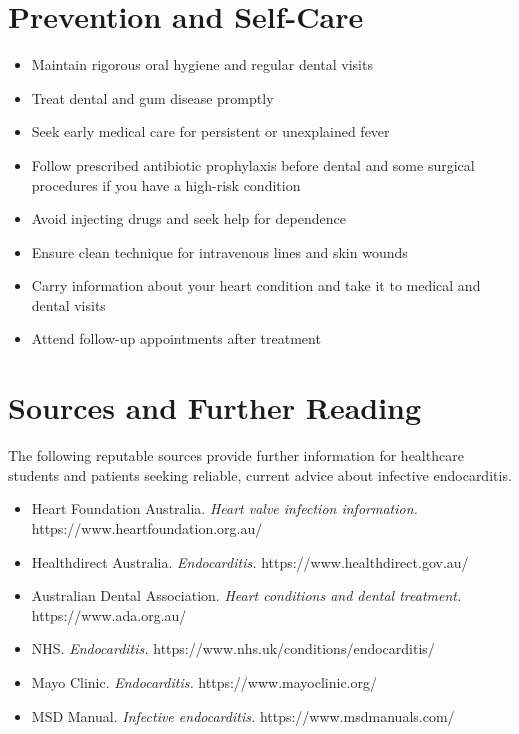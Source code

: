 \section*{Prevention and Self-Care}
\begin{itemize}
    \item Maintain rigorous oral hygiene and regular dental visits
    \item Treat dental and gum disease promptly
    \item Seek early medical care for persistent or unexplained fever
    \item Follow prescribed antibiotic prophylaxis before dental and some surgical procedures if you have a high-risk condition
    \item Avoid injecting drugs and seek help for dependence
    \item Ensure clean technique for intravenous lines and skin wounds
    \item Carry information about your heart condition and take it to medical and dental visits
    \item Attend follow-up appointments after treatment
\end{itemize}

\section*{Sources and Further Reading}
The following reputable sources provide further information for healthcare students and patients seeking reliable, current advice about infective endocarditis.
\begin{itemize}
    \item Heart Foundation Australia. \textit{Heart valve infection information.} https://www.heartfoundation.org.au/
    \item Healthdirect Australia. \textit{Endocarditis.} https://www.healthdirect.gov.au/
    \item Australian Dental Association. \textit{Heart conditions and dental treatment.} https://www.ada.org.au/
    \item NHS. \textit{Endocarditis.} https://www.nhs.uk/conditions/endocarditis/
    \item Mayo Clinic. \textit{Endocarditis.} https://www.mayoclinic.org/
    \item MSD Manual. \textit{Infective endocarditis.} https://www.msdmanuals.com/
\end{itemize}
